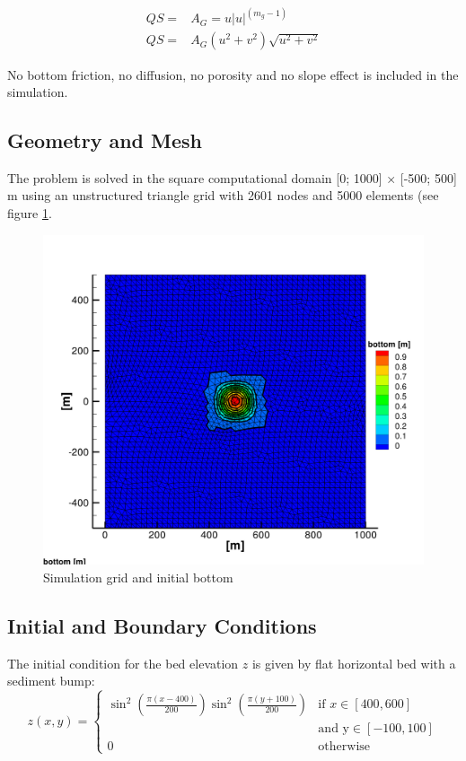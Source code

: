 \begin{equation}
\begin{array}{ll}
     QS = &A_G = u |u|^{(m_g-1)} \\
     QS = & A_G (u^2+v^2)  \sqrt{u^2 + v^2}
\end{array}
\end{equation}


No bottom friction, no diffusion, no porosity and no slope effect is included in the simulation.
%
\subsection{Geometry and Mesh}
%
The problem is solved in the
square computational domain [0; 1000] × [-500; 500] m using an unstructured triangle grid with 2601 nodes and
5000 elements (see figure \ref{ini}.
\begin{figure} [!h] %
\centering
\includegraphics[width=\textwidth]{../img/sis_bump2d-ini.png}
 \caption{Simulation grid and initial bottom}\label{ini}
\end{figure}

%
\subsection{Initial and Boundary Conditions}
%
The initial condition for the
bed elevation $z$ is given by flat horizontal bed with a sediment bump:
\begin{equation}
z(x,y) = \left\{
  \begin{array}{lr}
\sin^2 (\frac{\pi (x-400)}{200}) \sin^2 (\frac{\pi (y+100)}{200}) & \text{if } x \in [400, 600] \\
& \text{and y} \in [-100,100] \\
0 & \text{otherwise} 
  \end{array}
\right.
\end{equation}

